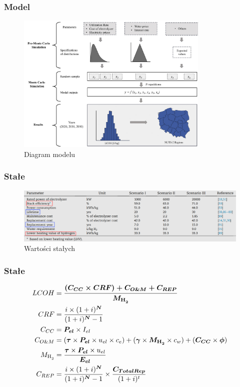 \documentclass{beamer}
\newcommand{\HH}{\ce{H2}\xspace}
\begin{document}
\begin{frame}
	\frametitle{Model}
	\begin{figure}
		\includegraphics[width=0.82\textwidth]{mmc-diag.png}
		\caption{Diagram modelu}
		\centering
	\end{figure}
\end{frame}


\begin{frame}
	\frametitle{Stałe}
	\begin{figure}
		\begin{center}
			\includegraphics[width=\textwidth]{mmc-constants-annotated.png}
		\end{center}
		\caption{Wartości stałych}
	\end{figure}
\end{frame}

\begin{frame}
	\frametitle{Stałe}
	\begin{align}
		LCOH     & = \boldsymbol{\frac{(C_{CC} \times CRF)
		+ C_{O\&M} + C_{REP}}{M_{\HH}}} \nonumber                                                      \\
		CRF      & =  \frac{i \times (1 + i)^{\boldsymbol{N}}}{(1 + i)^{\boldsymbol{N}} - 1} \nonumber \\
		C_{CC}   & =  \boldsymbol{P_{el}} \times I_{el} \nonumber                                      \\
		C_{O\&M} & =  (\boldsymbol{\tau} \times \boldsymbol{P_{el}} \times u_{el} \times c_e)
		+ (\boldsymbol{\gamma} \times \boldsymbol{M_{\HH}} \times c_w)
		+ (\boldsymbol{C_{CC}} \times \boldsymbol{\phi}) \nonumber                                     \\
		M_{\HH}  & =  \frac{\boldsymbol{\tau} \times \boldsymbol{P_{el}}
		\times u_{el}}{\boldsymbol{E_{el}}} \nonumber                                                  \\
		C_{REP}  & =  \frac{i \times (1 + i)^{\boldsymbol{N}}}{(1 + i)^{\boldsymbol{N}} - 1}
		\times \frac{\boldsymbol{C_{TotalRep}}}{(1+i)^t} \nonumber
	\end{align}
\end{frame}
\end{document}
